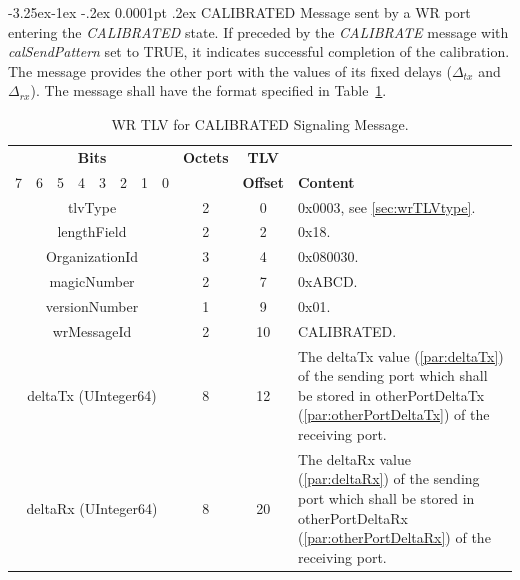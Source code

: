 \documentclass[a4paper, 12pt]{article}
\makeatletter
\renewcommand\paragraph{\@startsection{paragraph}{4}{\z@}%
                                     {-3.25ex\@plus -1ex \@minus -.2ex}%
                                     {0.0001pt \@plus .2ex}%
                                     {\normalfont\normalsize\bfseries}}
\makeatother
\begin{document}
\newpage



\paragraph{CALIBRATED} Message sent by a WR port entering the \textit{CALIBRATED} state. 
If preceded by the \textit{CALIBRATE} message with \textit{calSendPattern} set to TRUE, 
it indicates successful completion of the calibration. The message provides the other port with the 
values of its fixed delays ($\Delta_{tx}$ and $\Delta_{rx}$). 
The message shall have the format specified in Table~\ref{tab:wrCalibratedTLV}.

\begin{table}[tbp]
\caption{WR TLV for CALIBRATED Signaling Message.}
\centering
\begin{tabular}{| c | c | c | c | c | c | c | c | c | c |  p{7.5cm}  |}
\hline
\multicolumn{8}{|c|}{\textbf{Bits}} & \textbf{Octets} & \textbf{TLV} &\\
\cline{0-7}
7 & 6 & 5 & 4 & 3 & 2 & 1 & 0 &  &  \textbf{Offset}  & \textbf{Content}  \\
\hline
\multicolumn{8}{|c|}{tlvType               }  & 2  & 0  & 0x0003, see \ref{sec:wrTLVtype}. \\ \hline
\multicolumn{8}{|c|}{lengthField           }  & 2  & 2  & 0x18.   \\ \hline
\multicolumn{8}{|c|}{OrganizationId        }  & 3  & 4  & 0x080030.               \\ \hline
\multicolumn{8}{|c|}{magicNumber           }  & 2  & 7  & 0xABCD.               \\ \hline
\multicolumn{8}{|c|}{versionNumber         }  & 1  & 9  & 0x01.               \\ \hline
\multicolumn{8}{|c|}{wrMessageId           }  & 2  & 10 & CALIBRATED.               \\ \hline
\multicolumn{8}{|c|}{deltaTx (UInteger64)  }  & 8  & 12 & The deltaTx value (\ref{par:deltaTx}) 
							  of the sending port which shall be stored
							  in otherPortDeltaTx (\ref{par:otherPortDeltaTx})
							  of the receiving port.
							  \\ \hline
\multicolumn{8}{|c|}{deltaRx (UInteger64) }  & 8  & 20 & The deltaRx value (\ref{par:deltaRx}) 
							  of the sending port which shall be stored
							  in otherPortDeltaRx (\ref{par:otherPortDeltaRx})
							  of the receiving port. 
							  \\ \hline
\end{tabular}
\label{tab:wrCalibratedTLV}
\end{table}
\end{document}

